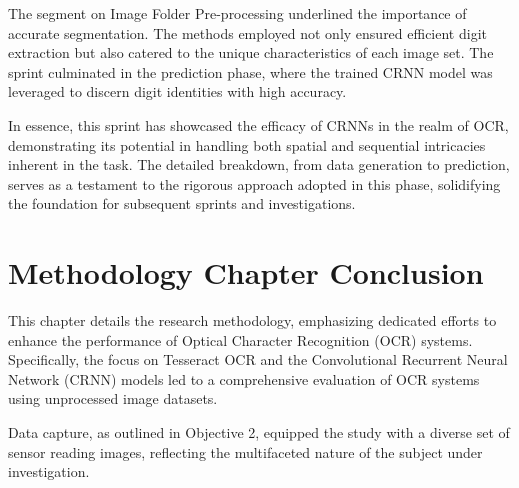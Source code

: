 The segment on Image Folder Pre-processing underlined the importance of accurate segmentation. The methods employed not only ensured efficient digit extraction but also catered to the unique characteristics of each image set. The sprint culminated in the prediction phase, where the trained CRNN model was leveraged to discern digit identities with high accuracy.

In essence, this sprint has showcased the efficacy of CRNNs in the realm of OCR, demonstrating its potential in handling both spatial and sequential intricacies inherent in the task. The detailed breakdown, from data generation to prediction, serves as a testament to the rigorous approach adopted in this phase, solidifying the foundation for subsequent sprints and investigations.



\section{Methodology Chapter Conclusion}

This chapter details the research methodology, emphasizing dedicated efforts to enhance the performance of Optical Character Recognition (OCR) systems. Specifically, the focus on Tesseract OCR and the Convolutional Recurrent Neural Network (CRNN) models led to a comprehensive evaluation of OCR systems using unprocessed image datasets.

Data capture, as outlined in Objective 2, equipped the study with a diverse set of sensor reading images, reflecting the multifaceted nature of the subject under investigation.

